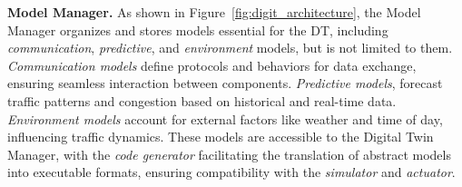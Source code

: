  



\textbf{Model Manager.}  
As shown in Figure~\ref{fig:digit_architecture}, the Model Manager organizes and stores models essential for the DT, including \textit{communication}, \textit{predictive}, and \textit{environment} models, but is not limited to them. \textit{Communication models} define protocols and behaviors for data exchange, ensuring seamless interaction between components. \textit{Predictive models}, forecast traffic patterns and congestion based on historical and real-time data. \textit{Environment models} account for external factors like weather and time of day, influencing traffic dynamics. These models are accessible to the Digital Twin Manager, with the \textit{code generator} facilitating the translation of abstract models into executable formats, ensuring compatibility with the \textit{simulator} and \textit{actuator}.



